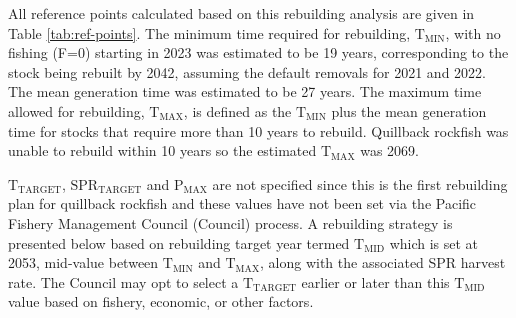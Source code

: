 \documentclass[11pt,
  english,
  a4paper,
]{article}
\begin{document}
All reference points calculated based on this rebuilding analysis are given in Table \ref{tab:ref-points}. The minimum time required for rebuilding, {\(\text{T}_\text{MIN}\)\leavevmode\tagmcend\tagstructend}, with no fishing (F=0) starting in 2023 was estimated to be 19 years, corresponding to the stock being rebuilt by 2042, assuming the default removals for 2021 and 2022. The mean generation time was estimated to be 27 years. The maximum time allowed for rebuilding, {\(\text{T}_\text{MAX}\)\leavevmode\tagmcend\tagstructend}, is defined as the {\(\text{T}_\text{MIN}\)\leavevmode\tagmcend\tagstructend} plus the mean generation time for stocks that require more than 10 years to rebuild. Quillback rockfish was unable to rebuild within 10 years so the estimated {\(\text{T}_\text{MAX}\)\leavevmode\tagmcend\tagstructend} was 2069.

\leavevmode\tagmcend\tagstructend\par


{\(\text{T}_\text{TARGET}\)\leavevmode\tagmcend\tagstructend}, {\(\text{SPR}_\text{TARGET}\)\leavevmode\tagmcend\tagstructend} and {\(\text{P}_\text{MAX}\)\leavevmode\tagmcend\tagstructend} are not specified since this is the first rebuilding plan for quillback rockfish and these values have not been set via the Pacific Fishery Management Council (Council) process. A rebuilding strategy is presented below based on rebuilding target year termed {\(\text{T}_\text{MID}\)\leavevmode\tagmcend\tagstructend} which is set at 2053, mid-value between {\(\text{T}_\text{MIN}\)\leavevmode\tagmcend\tagstructend} and {\(\text{T}_\text{MAX}\)\leavevmode\tagmcend\tagstructend}, along with the associated SPR harvest rate. The Council may opt to select a {\(\text{T}_\text{TARGET}\)\leavevmode\tagmcend\tagstructend} earlier or later than this {\(\text{T}_\text{MID}\)\leavevmode\tagmcend\tagstructend} value based on fishery, economic, or other factors.
\end{document}
